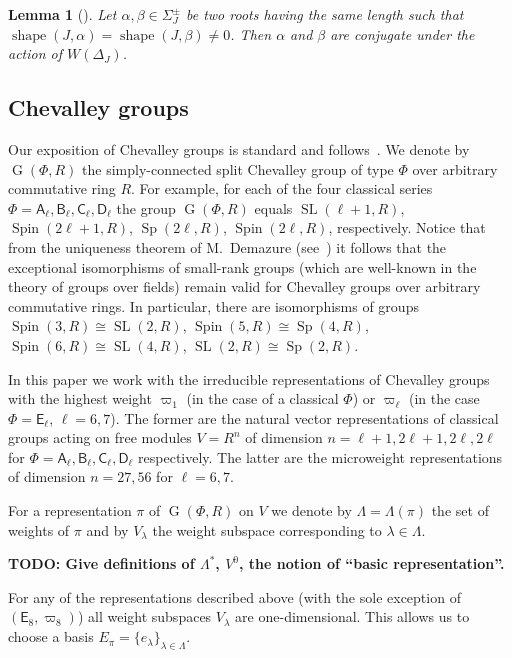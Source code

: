 \documentclass[12pt]{amsart}
\theoremstyle{plain} \declaretheorem[name=Theorem, Refname={Theorem,Theorems}]{thm} \Crefname{thm}{Theorem}{Theorems}
\numberwithin{equation}{section}
\newtheorem{lemma}{Lemma} \numberwithin{lemma}{section} \Crefname{lemma}{Lemma}{Lemmas}
\theoremstyle{definition} \newtheorem{dfn}[lemma]{Definition} \Crefname{dfn}{Definition}{Definitions}
\theoremstyle{remark} \newtheorem{rem}[lemma]{Remark} \Crefname{rem}{Remark}{Remarks}
\DeclareMathOperator{\G}{G}
\DeclareMathOperator{\SL}{SL}
\DeclareMathOperator{\Sp}{Sp}
\DeclareMathOperator{\shape}{shape}
\DeclareMathOperator{\Spin}{Spin}
\newcommand{\rA}{\mathsf{A}}
\newcommand{\rB}{\mathsf{B}}
\newcommand{\rC}{\mathsf{C}}
\newcommand{\rD}{\mathsf{D}}
\newcommand{\rE}{\mathsf{E}}
\begin{document}
\begin{lemma}[{\cite[Lemma~1]{ABS}}]\label{lemma:abs}
Let $\alpha, \beta \in \Sigma^\pm_J$ be two roots having the same length such that $\shape(J,\alpha)=\shape(J,\beta)\neq 0$.
Then $\alpha$ and $\beta$ are conjugate under the action of $W(\Delta_J)$.
\end{lemma}

\subsection{Chevalley groups}
Our exposition of Chevalley groups is standard and follows~\cite{Ta, S, St78, VP, Va86}.
We denote by $\G(\Phi, R)$ the simply-connected split Chevalley group of type $\Phi$ over arbitrary commutative ring $R$. For example, for each of the four classical series $\Phi=\rA_\ell, \rB_\ell, \rC_\ell, \rD_\ell$
the group $\G(\Phi, R)$ equals $\SL(\ell+1, R)$, $\Spin(2\ell+1, R)$, $\Sp(2\ell, R)$, $\Spin(2\ell, R)$, respectively. Notice that from the uniqueness theorem of M.~Demazure (see~\cite[Corollaire~5.2]{SGA3}) 
it follows that the exceptional isomorphisms of small-rank groups (which are well-known in the theory of groups over fields) remain valid for Chevalley groups over arbitrary commutative rings.
In particular, there are isomorphisms of groups $\Spin(3,R)\cong\SL(2,R)$, $\Spin(5, R)\cong \Sp(4, R)$, $\Spin(6, R)\cong\SL(4, R)$, $\SL(2, R)\cong \Sp(2, R)$.  

In this paper we work with the irreducible representations of Chevalley groups with the highest weight
$\varpi_1$ (in the case of a classical $\Phi$) or $\varpi_\ell$ (in the case $\Phi=\rE_\ell$, $\ell=6,7$). The former are the natural vector representations of classical groups acting on free modules $V=R^n$ of dimension $n=\ell+1, 2\ell+1, 2\ell,2\ell$ for $\Phi=\rA_\ell,\rB_\ell,\rC_\ell,\rD_\ell$ respectively.
The latter are the microweight representations of dimension $n=27, 56$ for $\ell=6,7$.

For a representation $\pi$ of $\G(\Phi, R)$ on $V$ we denote by $\Lambda=\Lambda(\pi)$ the set of weights of $\pi$ and by $V_\lambda$ the weight subspace corresponding to $\lambda\in\Lambda$.

\textbf{TODO: Give definitions of $\Lambda^*$, $V^0$, the notion of ``basic representation''. }

For any of the representations described above (with the sole exception of $(\rE_8, \varpi_8)$) all weight subspaces $V_\lambda$ are one-dimensional. 
This allows us to choose a basis $E_\pi=\{e_\lambda\}_{\lambda\in\Lambda}$.
\end{document}

